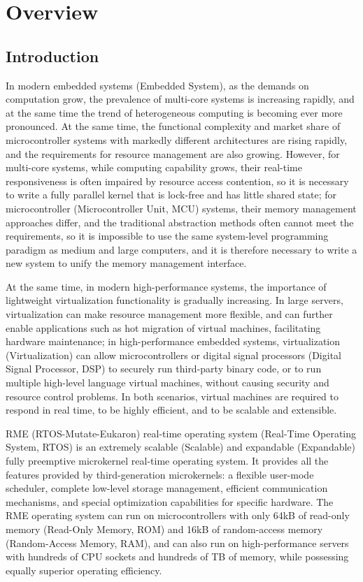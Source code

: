 \chapter{Overview}\label{ch:overview}

\section{Introduction}\label{sec:1-introduction}

In modern embedded systems (Embedded System), as the demands on computation grow, the prevalence of multi-core systems is increasing rapidly, and at the same time the trend of heterogeneous computing is becoming ever more pronounced. At the same time, the functional complexity and market share of microcontroller systems with markedly different architectures are rising rapidly, and the requirements for resource management are also growing. However, for multi-core systems, while computing capability grows, their real-time responsiveness is often impaired by resource access contention, so it is necessary to write a fully parallel kernel that is lock-free and has little shared state; for microcontroller (Microcontroller Unit, MCU) systems, their memory management approaches differ, and the traditional abstraction methods often cannot meet the requirements, so it is impossible to use the same system-level programming paradigm as medium and large computers, and it is therefore necessary to write a new system to unify the memory management interface.

At the same time, in modern high-performance systems, the importance of lightweight virtualization functionality is gradually increasing. In large servers, virtualization can make resource management more flexible, and can further enable applications such as hot migration of virtual machines, facilitating hardware maintenance; in high-performance embedded systems, virtualization (Virtualization) can allow microcontrollers or digital signal processors (Digital Signal Processor, DSP) to securely run third-party binary code, or to run multiple high-level language virtual machines, without causing security and resource control problems. In both scenarios, virtual machines are required to respond in real time, to be highly efficient, and to be scalable and extensible.

RME (RTOS-Mutate-Eukaron) real-time operating system (Real-Time Operating System, RTOS) is an extremely scalable (Scalable) and expandable (Expandable) fully preemptive microkernel real-time operating system. It provides all the features provided by third-generation microkernels: a flexible user-mode scheduler, complete low-level storage management, efficient communication mechanisms, and special optimization capabilities for specific hardware. The RME operating system can run on microcontrollers with only 64kB of read-only memory (Read-Only Memory, ROM) and 16kB of random-access memory (Random-Access Memory, RAM), and can also run on high-performance servers with hundreds of CPU sockets and hundreds of TB of memory, while possessing equally superior operating efficiency.

